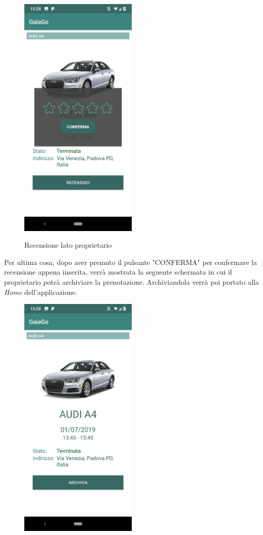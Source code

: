 \begin{itemize}
\begin{figure}[H]
		\includegraphics[width=0.5\textwidth]{res/images/recensione.png}\\
		\caption{Recensione lato proprietario}
		\label{recensione2}
	\end{figure}
\pagebreak
	Per ultima cosa, dopo aver premuto il pulsante "CONFERMA" per confermare la recensione appena inserita, verrà mostrata la seguente schermata in cui il proprietario potrà archiviare la prenotazione. Archiviandola verrà poi portato alla \textit{Home} dell'applicazione.
	\begin{figure}[H] 
		\centering 
		\includegraphics[width=0.5\textwidth]{res/images/archivia_prenotazione.png}\\

\end{figure}
\end{itemize}
